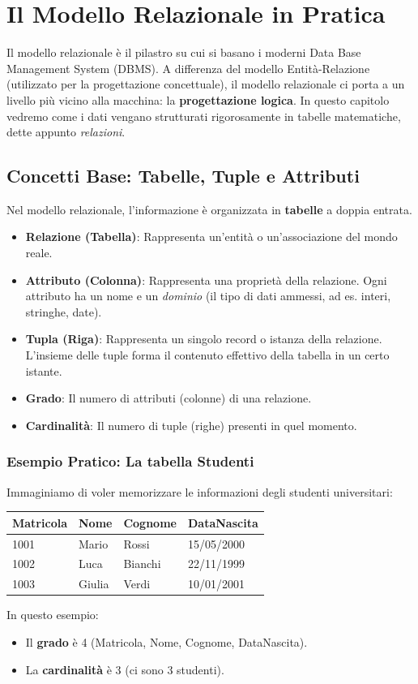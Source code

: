 \chapter{Il Modello Relazionale in Pratica}
\label{ch:modello_relazionale}

Il modello relazionale è il pilastro su cui si basano i moderni Data Base Management System (DBMS). A differenza del modello Entità-Relazione (utilizzato per la progettazione concettuale), il modello relazionale ci porta a un livello più vicino alla macchina: la \textbf{progettazione logica}. In questo capitolo vedremo come i dati vengano strutturati rigorosamente in tabelle matematiche, dette appunto \textit{relazioni}.

\section{Concetti Base: Tabelle, Tuple e Attributi}
Nel modello relazionale, l'informazione è organizzata in \textbf{tabelle} a doppia entrata.
\begin{itemize}
    \item \textbf{Relazione (Tabella)}: Rappresenta un'entità o un'associazione del mondo reale.
    \item \textbf{Attributo (Colonna)}: Rappresenta una proprietà della relazione. Ogni attributo ha un nome e un \textit{dominio} (il tipo di dati ammessi, ad es. interi, stringhe, date).
    \item \textbf{Tupla (Riga)}: Rappresenta un singolo record o istanza della relazione. L'insieme delle tuple forma il contenuto effettivo della tabella in un certo istante.
    \item \textbf{Grado}: Il numero di attributi (colonne) di una relazione.
    \item \textbf{Cardinalità}: Il numero di tuple (righe) presenti in quel momento.
\end{itemize}

\subsection*{Esempio Pratico: La tabella Studenti}
Immaginiamo di voler memorizzare le informazioni degli studenti universitari:
\begin{center}
\renewcommand{\arraystretch}{1.2}
\begin{tabular}{|l|l|l|l|}
\hline
\textbf{Matricola} & \textbf{Nome} & \textbf{Cognome} & \textbf{DataNascita} \\
\hline
1001 & Mario & Rossi & 15/05/2000 \\
1002 & Luca & Bianchi & 22/11/1999 \\
1003 & Giulia & Verdi & 10/01/2001 \\
\hline
\end{tabular}
\end{center}
In questo esempio:
\begin{itemize}
    \item Il \textbf{grado} è 4 (Matricola, Nome, Cognome, DataNascita).
    \item La \textbf{cardinalità} è 3 (ci sono 3 studenti).
\end{itemize}

